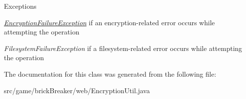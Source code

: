 \begin{DoxyExceptions}{Exceptions}
\item[{\em \hyperlink{classbrick_breaker_1_1web_1_1_encryption_failure_exception}{EncryptionFailureException}}]if an encryption-\/related error occurs while attempting the operation \item[{\em FilesystemFailureException}]if a filesystem-\/related error occurs while attempting the operation \end{DoxyExceptions}


The documentation for this class was generated from the following file:\begin{DoxyCompactItemize}
\item 
src/game/brickBreaker/web/EncryptionUtil.java\end{DoxyCompactItemize}
